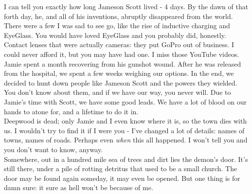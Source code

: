 \documentclass[a5paper]{scrartcl}
\begin{document}
I can tell you exactly how long Jameson Scott lived - 4 days. By the dawn of that forth day, he, and all of his inventions, abruptly disappeared from the world. There were a few I was sad to see go, like the rise of inductive charging and EyeGlass. You would have loved EyeGlass and you probably did, honestly.  Contact lenses that were actually cameras: they put GoPro out of business. I could never afford it, but you may have had one. I miss those YouTube videos. \\


Jamie spent a month recovering from his gunshot wound. After he was released from the hospital, we spent a few weeks weighing our options. In the end, we decided to hunt down people like Jameson Scott and the powers they wielded. You don't know about them, and if we have our way, you never will. Due to Jamie's time with Scott, we have some good leads. We have a lot of blood on our hands to atone for, and a lifetime to do it in. \\


Deepwood is dead; only Jamie and I even know where it is, so the town dies with us. I wouldn't try to find it if I were you - I've changed a lot of details: names of towns, names of roads. Perhaps even \textit{when}
 this all happened. I won't tell you and you don't want to know, anyway.\\


Somewhere, out in a hundred mile sea of trees and dirt lies the demon's door. It's still there, under a pile of rotting detritus that used to be a small church. The door may be found again someday, it may even be opened. But one thing is for damn sure: it sure as hell won't be because of me.
\end{document}
